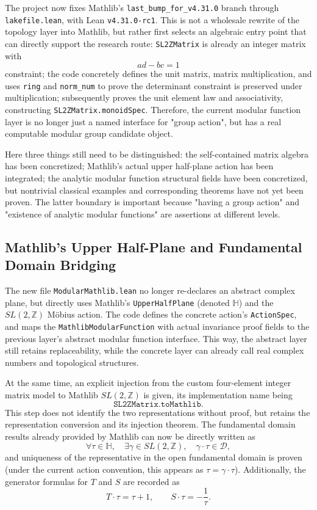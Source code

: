 \documentclass[UTF8,a4paper,11pt]{article}
\begin{document}
The project now fixes Mathlib's
\texttt{last\_bump\_for\_v4.31.0} branch through \texttt{lakefile.lean}, with Lean
\texttt{v4.31.0-rc1}. This is not a wholesale rewrite of the topology layer into Mathlib, but rather first selects an algebraic entry point that can directly support the research route:
\texttt{SL2ZMatrix} is already an integer matrix with
\[
  ad-bc=1
\]
constraint; the code concretely defines the unit matrix, matrix multiplication, and uses \texttt{ring} and
\texttt{norm\_num} to prove the determinant constraint is preserved under multiplication; subsequently proves the unit element law and associativity, constructing
\texttt{SL2ZMatrix.monoidSpec}. Therefore, the current modular function layer is no longer just a named interface for "group action", but has a real computable modular group candidate object.

Here three things still need to be distinguished: the self-contained matrix algebra has been concretized; Mathlib's actual upper half-plane action has been integrated; the analytic modular function structural fields have been concretized, but nontrivial classical examples and corresponding theorems have not yet been proven. The latter boundary is important because "having a group action" and "existence of analytic modular functions" are assertions at different levels.

\subsection{Mathlib's Upper Half-Plane and Fundamental Domain Bridging}

The new file \texttt{ModularMathlib.lean} no longer re-declares an abstract complex plane, but directly uses Mathlib's
\texttt{UpperHalfPlane} (denoted \(\mathbb H\)) and the $SL(2,\mathbb Z)$ Möbius action. The code defines the concrete action's \texttt{ActionSpec}, and maps the \texttt{MathlibModularFunction} with actual invariance proof fields to the previous layer's abstract modular function interface. This way, the abstract layer still retains replaceability, while the concrete layer can already call real complex numbers and topological structures.

At the same time, an explicit injection from the custom four-element integer matrix model to Mathlib
\(SL(2,\mathbb Z)\) is given, its implementation name being
\[
\texttt{SL2ZMatrix.toMathlib}.
\]
This step does not identify the two representations without proof, but retains the representation conversion and its injection theorem. The fundamental domain results already provided by Mathlib can now be directly written as
\[
  \forall\tau\in\mathbb H,\quad
  \exists\gamma\in SL(2,\mathbb Z),\quad
  \gamma\cdot\tau\in\mathcal D,
\]
and uniqueness of the representative in the open fundamental domain is proven (under the current action convention, this appears as \(\tau=\gamma\cdot\tau\)). Additionally, the generator formulas for $T$ and $S$ are recorded as
\[
  T\cdot\tau=\tau+1,\qquad
  S\cdot\tau=-\frac{1}{\tau}.
\]
\end{document}
